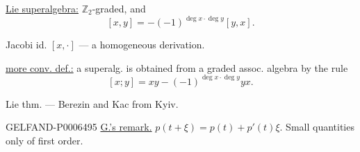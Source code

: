 \underline{Lie superalgebra:} \(\mathbb Z_2\)-graded, and
\[
[x,y]=-(-1)^{\deg x\cdot\deg y}[y,x].
\]

Jacobi id. \([x,\cdot]\) --- a homogeneous derivation.

\underline{more conv. def.:} a superalg. is obtained from a graded assoc. algebra by the rule
\[
[x;y]=xy-(-1)^{\deg x\cdot\deg y}yx.
\]

Lie thm. --- Berezin and Kac from Kyiv.

\begin{GelfandAdjacentEvidence}{GELFAND-P000649}{5}
\underline{G.’s remark.} \(p(t+\xi)=p(t)+p'(t)\xi\). Small quantities only of first order.
\end{GelfandAdjacentEvidence}



